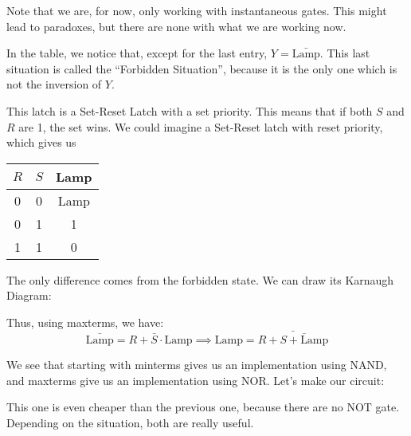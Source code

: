 \documentclass[a4paper]{article}
\begin{document}
{    Note that we are, for now, only working with instantaneous gates. This might lead to paradoxes, but there are none with what we are working now.

    In the table, we notice that, except for the last entry, $Y = \bar{\text{Lamp}}$. This last situation is called the ``Forbidden Situation'', because it is the only one which is not the inversion of $Y$.
    
    This latch is a Set-Reset Latch with a set priority. This means that if both $S$ and $R$ are 1, the set wins. We could imagine a Set-Reset latch with reset priority, which gives us
    \begin{center}
    \begin{tabular}{cc|c}
        $R$ & $S$ & Lamp \\
        \hline
        0 & 0 & Lamp \\
        0 & 1 & 1 \\
        1 & 1 & 0 \\
    \end{tabular}
    \end{center}
    
    The only difference comes from the forbidden state. We can draw its Karnaugh Diagram:

    Thus, using maxterms, we have: 
    \[\bar{\text{Lamp}} = R + \bar{S} \cdot \text{Lamp} \implies \text{Lamp} = \bar{R + \bar{S + \text{Lamp}}}\]
    
    We see that starting with minterms gives us an implementation using NAND, and maxterms give us an implementation using NOR. Let's make our circuit: 

    This one is even cheaper than the previous one, because there are no NOT gate. Depending on the situation, both are really useful.
}
\end{document}
